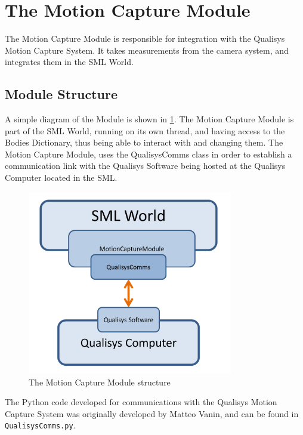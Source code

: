 
\section{The Motion Capture Module}
\label{sec:the_motion_capture_model}

The Motion Capture Module is responsible for integration with the Qualisys Motion Capture System. It takes measurements from the camera system, and integrates them in the SML World.

\subsection{Module Structure}

A simple diagram of the Module is shown in \ref{fig:motion_capture_module_diagram}. The Motion Capture Module is part of the SML World, running on its own thread, and having access to the Bodies Dictionary, thus being able to interact with and changing them. The Motion Capture Module, uses the QualisysComms class in order to establish a communication link with the Qualisys Software being hosted at the Qualisys Computer located in the SML.

\begin{figure}[h!]
  \centering
    \includegraphics[width=0.8\textwidth]{motion_capture_module_diagram}
    \caption{The Motion Capture Module structure \label{fig:motion_capture_module_diagram} }
\end{figure}

The Python code developed for communications with the Qualisys Motion Capture System was originally developed by Matteo Vanin, and can be found in \texttt{QualisysComms.py}. 

